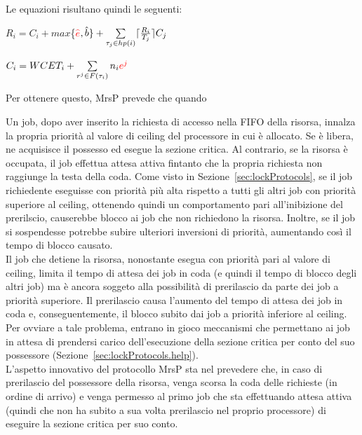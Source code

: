 Le equazioni risultano quindi le seguenti:\\

\centerline{$R_i = C_i + max$\{\textcolor{red}{$\hat{e}$}$,\hat{b}\} + \sum\limits_{\tau_j \in hp(i)} \lceil\frac{R_i}{T_j}\rceil C_j$}

\centerline{$C_i = WCET_i + \sum\limits_{r^j \in F(\tau_i)} n_i \textcolor{red}{e^j}$}

\vspace{4 mm}

Per ottenere questo, MrsP prevede che quando 

Un job, dopo aver inserito la richiesta di accesso nella FIFO della risorsa, innalza la propria priorità al valore di ceiling del processore in cui è allocato. Se è libera, ne acquisisce il possesso ed esegue la sezione critica. Al contrario, se la risorsa è occupata, il job effettua attesa attiva fintanto che la propria richiesta non raggiunge la testa della coda. Come visto in Sezione~\ref{sec:lockProtocols}, se il job richiedente eseguisse con priorità più alta rispetto a tutti gli altri job con priorità superiore al ceiling, ottenendo quindi un comportamento pari all’inibizione del prerilscio, causerebbe blocco ai job che non richiedono la risorsa. Inoltre, se il job si sospendesse potrebbe subire ulteriori inversioni di priorità, aumentando così il tempo di blocco causato.\\

Il job che detiene la risorsa, nonostante esegua con priorità pari al valore di ceiling, limita il tempo di attesa dei job in coda (e quindi il tempo di blocco degli altri job) ma è ancora soggeto alla possibilità di prerilascio da parte dei job a priorità superiore. Il prerilascio causa l'aumento del tempo di attesa dei job in coda e, conseguentemente, il blocco subito dai job a priorità inferiore al ceiling. Per ovviare a tale problema, entrano in gioco meccanismi che permettano ai job in attesa di prendersi carico dell’esecuzione della sezione critica per conto del suo possessore (Sezione~\ref{sec:lockProtocols.help}).\\

L'aspetto innovativo del protocollo MrsP sta nel prevedere che, in caso di prerilascio del possessore della risorsa, venga scorsa la coda delle richieste (in ordine di arrivo) e venga permesso al primo job che sta effettuando attesa attiva (quindi che non ha subito a sua volta prerilascio nel proprio processore) di eseguire la sezione critica per suo conto.\\

